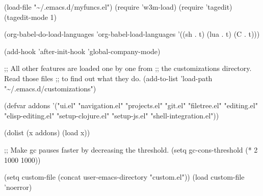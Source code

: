 \documentclass[11pt]{article}
\begin{document}
(load-file "\textasciitilde{}/.emacs.d/myfuncs.el")
(require 'w3m-load)
(require 'tagedit)
(tagedit-mode 1)

(org-babel-do-load-languages 'org-babel-load-languages
                             '((sh . t)
                               (lua . t)
                               (C . t)))

(add-hook 'after-init-hook 'global-company-mode)

;; All other features are loaded one by one from
;; the customizations directory. Read those files
;; to find out what they do.
(add-to-list 'load-path "\textasciitilde{}/.emacs.d/customizations")

(defvar addons
  '("ui.el"
    "navigation.el"
    "projects.el"
    "git.el"
    "filetree.el"
    "editing.el"
    "elisp-editing.el"
    "setup-clojure.el"
    "setup-js.el"
    "shell-integration.el"))

(dolist (x addons)
  (load x))

;; Make gc pauses faster by decreasing the threshold.
(setq gc-cons-threshold (* 2 1000 1000))

(setq custom-file (concat user-emacs-directory "custom.el"))
(load custom-file 'noerror)
\end{document}
